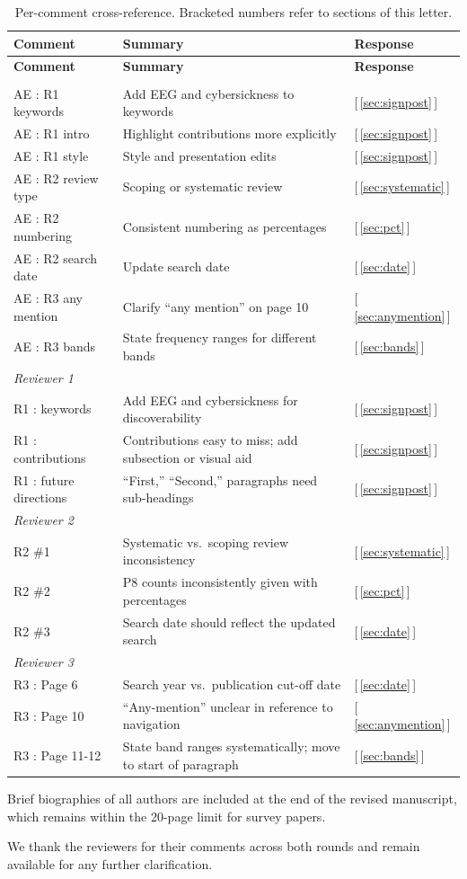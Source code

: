 \documentclass[11pt,a4paper]{article}
\newcommand{\xref}[1]{\textcolor{blue!50!black}{[\,#1\,]}}
\begin{document}
\begin{longtable}{p{} p{} p{}}
\caption{Per-comment cross-reference. Bracketed numbers refer to sections of this letter.}\label{tab:xref}\\
\toprule
\textbf{Comment} & \textbf{Summary} & \textbf{Response} \\
\midrule
\endfirsthead
\toprule
\textbf{Comment} & \textbf{Summary} & \textbf{Response} \\
\midrule
\endhead
\bottomrule
\endfoot

\multicolumn{3}{l}{\textit{Associate Editor}}\\
AE : R1 keywords & Add EEG and cybersickness to keywords & \xref{\ref{sec:signpost}} \\
AE : R1 intro & Highlight contributions more explicitly & \xref{\ref{sec:signpost}} \\
AE : R1 style & Style and presentation edits & \xref{\ref{sec:signpost}} \\
AE : R2 review type & Scoping or systematic review & \xref{\ref{sec:systematic}} \\
AE : R2 numbering & Consistent numbering as percentages & \xref{\ref{sec:pct}} \\
AE : R2 search date & Update search date & \xref{\ref{sec:date}} \\
AE : R3 any mention & Clarify ``any mention'' on page 10 & \xref{\ref{sec:anymention}} \\
AE : R3 bands & State frequency ranges for different bands & \xref{\ref{sec:bands}} \\
\midrule
\multicolumn{3}{l}{\textit{Reviewer 1}}\\
R1 : keywords & Add EEG and cybersickness for discoverability & \xref{\ref{sec:signpost}} \\
R1 : contributions & Contributions easy to miss; add subsection or visual aid & \xref{\ref{sec:signpost}} \\
R1 : future directions & ``First,'' ``Second,'' paragraphs need sub-headings & \xref{\ref{sec:signpost}} \\
\midrule
\multicolumn{3}{l}{\textit{Reviewer 2}}\\
R2 \#1 & Systematic vs.\ scoping review inconsistency & \xref{\ref{sec:systematic}} \\
R2 \#2 & P8 counts inconsistently given with percentages & \xref{\ref{sec:pct}} \\
R2 \#3 & Search date should reflect the updated search & \xref{\ref{sec:date}} \\
\midrule
\multicolumn{3}{l}{\textit{Reviewer 3}}\\
R3 : Page 6 & Search year vs.\ publication cut-off date & \xref{\ref{sec:date}} \\
R3 : Page 10 & ``Any-mention'' unclear in reference to navigation & \xref{\ref{sec:anymention}} \\
R3 : Page 11-12 & State band ranges systematically; move to start of paragraph & \xref{\ref{sec:bands}} \\
\end{longtable}

\bigskip
\noindent Brief biographies of all authors are included at the end of the revised manuscript, which remains within the 20-page limit for survey papers.

\bigskip
\noindent We thank the reviewers for their comments across both rounds and remain available for any further clarification.
\end{document}
